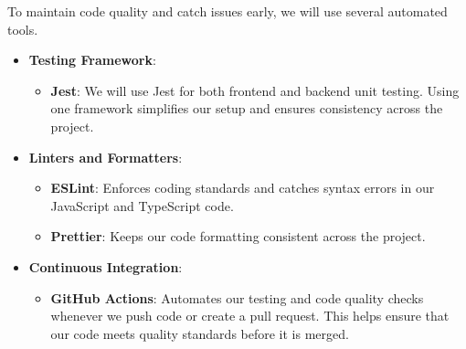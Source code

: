 \documentclass[12pt, titlepage]{article}
\begin{document}
To maintain code quality and catch issues early, we will use several automated tools.
\begin{itemize}
    \item \textbf{Testing Framework}:
        \begin{itemize}
            \item \textbf{Jest}: We will use Jest for both frontend and backend unit testing. Using one framework simplifies our setup and ensures consistency across the project.
        \end{itemize}
    \item \textbf{Linters and Formatters}:
        \begin{itemize}
            \item \textbf{ESLint}: Enforces coding standards and catches syntax errors in our JavaScript and TypeScript code.
            \item \textbf{Prettier}: Keeps our code formatting consistent across the project.
        \end{itemize}
    \item \textbf{Continuous Integration}:
        \begin{itemize}
            \item \textbf{GitHub Actions}: Automates our testing and code quality checks whenever we push code or create a pull request. This helps ensure that our code meets quality standards before it is merged.
        \end{itemize}
\end{itemize}
\end{document}
